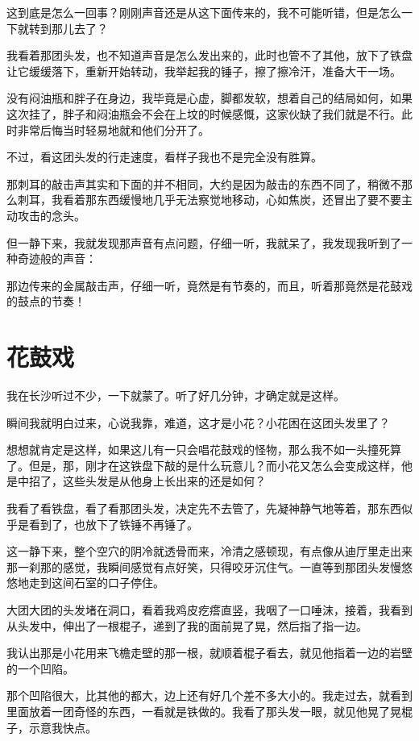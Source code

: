 这到底是怎么一回事？刚刚声音还是从这下面传来的，我不可能听错，但是怎么一下就转到那儿去了？

我看着那团头发，也不知道声音是怎么发出来的，此时也管不了其他，放下了铁盘让它缓缓落下，重新开始转动，我举起我的锤子，擦了擦冷汗，准备大干一场。

没有闷油瓶和胖子在身边，我毕竟是心虚，脚都发软，想着自己的结局如何，如果这次挂了，胖子和闷油瓶会不会在上坟的时候感慨，这家伙缺了我们就是不行。此时非常后悔当时轻易地就和他们分开了。

不过，看这团头发的行走速度，看样子我也不是完全没有胜算。

那刺耳的敲击声其实和下面的并不相同，大约是因为敲击的东西不同了，稍微不那么刺耳，我看着那东西缓慢地几乎无法察觉地移动，心如焦炭，还冒出了要不要主动攻击的念头。

但一静下来，我就发现那声音有点问题，仔细一听，我就呆了，我发现我听到了一种奇迹般的声音：

那边传来的金属敲击声，仔细一听，竟然是有节奏的，而且，听着那竟然是花鼓戏的鼓点的节奏！

\chapter{花鼓戏}

我在长沙听过不少，一下就蒙了。听了好几分钟，才确定就是这样。

瞬间我就明白过来，心说我靠，难道，这才是小花？小花困在这团头发里了？

想想就肯定是这样，如果这儿有一只会唱花鼓戏的怪物，那么我不如一头撞死算了。但是，那，刚才在这铁盘下敲的是什么玩意儿？而小花又怎么会变成这样，他是中招了，这些头发是从他身上长出来的还是如何？

我看了看铁盘，看了看那团头发，决定先不去管了，先凝神静气地等着，那东西似乎是看到了，也放下了铁锤不再锤了。

这一静下来，整个空穴的阴冷就透骨而来，冷清之感顿现，有点像从迪厅里走出来那一刹那的感觉，我瞬间感觉有点好笑，只得咬牙沉住气。一直等到那团头发慢悠悠地走到这间石室的口子停住。

大团大团的头发堵在洞口，看着我鸡皮疙瘩直竖，我咽了一口唾沫，接着，我看到从头发中，伸出了一根棍子，递到了我的面前晃了晃，然后指了指一边。

我认出那是小花用来飞檐走壁的那一根，就顺着棍子看去，就见他指着一边的岩壁的一个凹陷。

那个凹陷很大，比其他的都大，边上还有好几个差不多大小的。我走过去，就看到里面放着一团奇怪的东西，一看就是铁做的。我看了那头发一眼，就见他晃了晃棍子，示意我快点。

